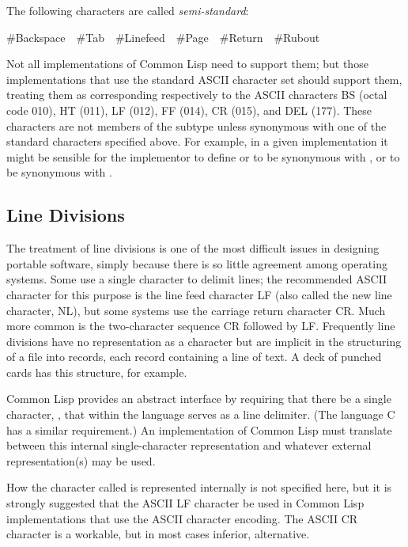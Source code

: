 The following characters are called \emph{semi-standard}:
\begin{lisp}
\#{\Xbackslash}Backspace~~\#{\Xbackslash}Tab~~\#{\Xbackslash}Linefeed~~\#{\Xbackslash}Page~~\#{\Xbackslash}Return~~\#{\Xbackslash}Rubout
\end{lisp}
Not all implementations of Common Lisp need to support them; but those
implementations that
use the standard ASCII character set should support them, treating them as
corresponding respectively to the ASCII characters BS (octal code 010),
HT (011), LF (012), FF (014), CR (015), and DEL
(177). These characters are not
members of the subtype  unless synonymous with
one of the standard characters specified above.
For example, in a given implementation it might
be sensible for the implementor to define
 or  to be synonymous with ,
or  to be synonymous with .

\subsection{Line Divisions}

The treatment of line divisions is one of the most difficult issues
in designing portable software, simply because there is so little agreement
among operating systems.  Some use a single character to delimit lines;
the recommended ASCII character for this purpose is the line feed character
LF (also called the new line character, NL),
but some systems use the carriage
return character CR.  Much more common is the two-character sequence
CR followed by LF.  Frequently line divisions have no representation
as a character but are implicit in the structuring of a file into records,
each record containing a line of text.  A deck of punched cards has this
structure, for example.

Common Lisp provides an abstract interface by requiring that there be a single
character, , that within the language serves as a line
delimiter.  (The language C has a similar requirement.)
An implementation of Common Lisp must translate between this internal
single-character representation and whatever external representation(s)
may be used.

\beforenoterule
\begin{implementation}
How the character called  is represented
internally is not specified here, but it is strongly suggested that
the ASCII LF character be used in Common Lisp implementations that use the
ASCII character encoding.  The ASCII CR character is a workable,
but in most cases inferior, alternative.
\end{implementation}
\afternoterule

